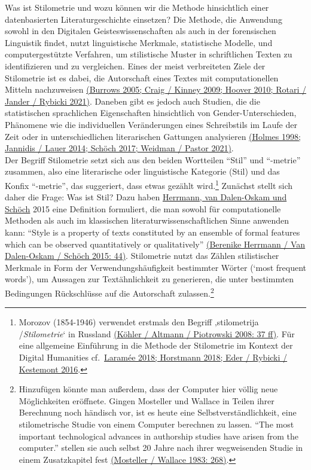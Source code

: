 \documentclass[
  letterpaper,
  DIV=11,
  numbers=noendperiod]{scrreprt}
\begin{document}
Was ist Stilometrie und wozu können wir die Methode hinsichtlich einer
datenbasierten Literaturgeschichte einsetzen? Die Methode, die Anwendung
sowohl in den Digitalen Geisteswissenschaften als auch in der
forensischen Linguistik findet, nutzt linguistische Merkmale,
statistische Modelle, und computergestützte Verfahren, um stilistische
Muster in schriftlichen Texten zu identifizieren und zu vergleichen.
Eines der meist verbreiteten Ziele der Stilometrie ist es dabei, die
Autorschaft eines Textes mit computationellen Mitteln nachzuweisen
\href{https://www.zotero.org/google-docs/?maUret}{(Burrows 2005; Craig /
Kinney 2009; Hoover 2010; Rotari / Jander / Rybicki 2021)}. Daneben gibt
es jedoch auch Studien, die die statistischen sprachlichen Eigenschaften
hinsichtlich von Gender-Unterschieden, Phänomene wie die individuellen
Veränderungen eines Schreibstils im Laufe der Zeit oder in
unterschiedlichen literarischen Gattungen analysieren
\href{https://www.zotero.org/google-docs/?zoKZNO}{(Holmes 1998; Jannidis
/ Lauer 2014; Schöch 2017; Weidman / Pastor 2021)}.\\
Der Begriff Stilometrie setzt sich aus den beiden Wortteilen ``Stil''
und ``-metrie'' zusammen, also eine literarische oder linguistische
Kategorie (Stil) und das Konfix ``-metrie'', das suggeriert, dass etwas
gezählt wird.\footnote{Morozov (1854-1946) verwendet erstmals den
  Begriff ‚stilometrija /\emph{Stilometrie}` in Russland
  \href{https://www.zotero.org/google-docs/?f8q9Cp}{(Köhler / Altmann /
  Piotrowski 2008: 37 ff)}. Für eine allgemeine Einführung in die
  Methode der Stilometrie im Kontext der Digital Humanities
  cf.~\href{https://www.zotero.org/google-docs/?HuzYg6}{Laramée 2018;
  Horstmann 2018; Eder / Rybicki / Kestemont 2016}.} Zunächst stellt
sich daher die Frage: Was ist Stil? Dazu haben
\href{https://www.zotero.org/google-docs/?broken=IVkLlM}{Herrmann, van
Dalen-Oskam und Schöch} 2015 eine Definition formuliert, die man sowohl
für computationelle Methoden als auch im klassischen
literaturwissenschaftlichen Sinne anwenden kann: ``Style is a property
of texts constituted by an ensemble of formal features which can be
observed quantitatively or qualitatively''
\href{https://www.zotero.org/google-docs/?Ri2hm4}{(Berenike Herrmann /
Van Dalen-Oskam / Schöch 2015: 44)}. Stilometrie nutzt das Zählen
stilistischer Merkmale in Form der Verwendungshäufigkeit bestimmter
Wörter (`most frequent words'), um Aussagen zur Textähnlichkeit zu
generieren, die unter bestimmten Bedingungen Rückschlüsse auf die
Autorschaft zulassen.\footnote{Hinzufügen könnte man außerdem, dass der
  Computer hier völlig neue Möglichkeiten eröffnete. Gingen Mosteller
  und Wallace in Teilen ihrer Berechnung noch händisch vor, ist es heute
  eine Selbstverständlichkeit, eine stilometrische Studie von einem
  Computer berechnen zu lassen. ``The most important technological
  advances in authorship studies have arisen from the computer.''
  stellen sie auch selbst 20 Jahre nach ihrer wegweisenden Studie in
  einem Zusatzkapitel fest
  \href{https://www.zotero.org/google-docs/?0tygyZ}{(Mosteller / Wallace
  1983: 268)}.}
\end{document}
